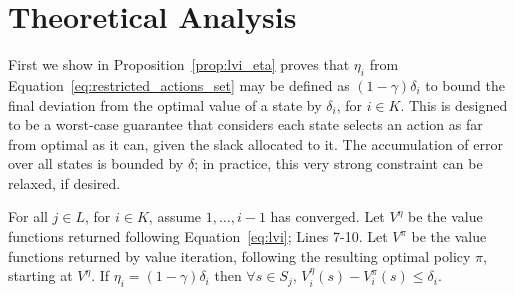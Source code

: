 \section{Theoretical Analysis}
\label{sec:theoretical_analysis}

First we show in Proposition~\ref{prop:lvi_eta} proves that $\eta_i$ from Equation~\ref{eq:restricted_actions_set} may be defined as $(1 - \gamma) \delta_i$ to bound the final deviation from the optimal value of a state by $\delta_i$, for $i \in K$. This is designed to be a worst-case guarantee that considers each state selects an action as far from optimal as it can, given the slack allocated to it. The accumulation of error over all states is bounded by $\delta$; in practice, this very strong constraint can be relaxed, if desired.

\begin{proposition}
    \label{prop:lvi_eta}
    For all $j \in L$, for $i \in K$, assume $1, \ldots, i - 1$ has converged. Let $V^\eta$ be the value functions returned following Equation~\ref{eq:lvi}; Lines 7-10. Let $V^\pi$ be the value functions returned by value iteration, following the resulting optimal policy $\pi$, starting at $V^\eta$. If $\eta_i = (1 - \gamma) \delta_i$ then $\forall s \in S_j$, $V_i^\eta(s) - V_i^\pi(s) \leq \delta_i$.
\end{proposition}

